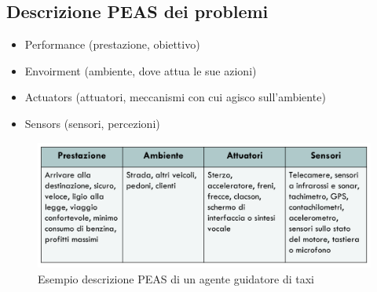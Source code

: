 \documentclass{article}
\begin{document}
\subsection{Descrizione PEAS dei problemi}
\begin{itemize}
    \item Performance (prestazione, obiettivo)
    \item Envoirment (ambiente, dove attua le sue azioni)
    \item Actuators (attuatori, meccanismi con cui agisco sull'ambiente)
    \item Sensors (sensori, percezioni)
\end{itemize}
\begin{figure}[H]
    \centering
    \includegraphics[scale=0.4]{Images/esempioPEAS.png}
    \caption{Esempio descrizione PEAS di un agente guidatore di taxi}
\end{figure}
\clearpage
\end{document}
